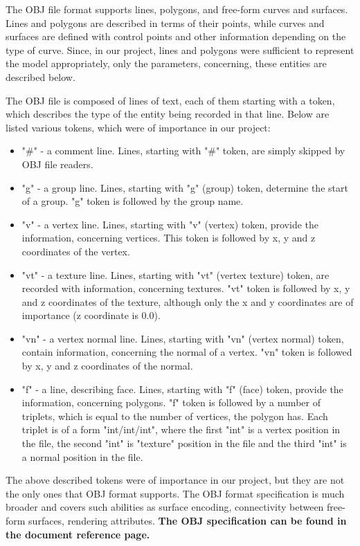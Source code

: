\documentclass[times, 10pt,twocolumn]{article}
\begin{document}
The OBJ file format supports lines, polygons, and free-form curves and surfaces. Lines and polygons are described in terms of their points, while curves and surfaces are defined with control points and other information depending on the type of curve. Since, in our project, lines and polygons were sufficient to represent the model appropriately, only the parameters, concerning, these entities are described below.

The OBJ file is composed of lines of text, each of them starting with a token, which describes the type of the entity being  recorded in that line. Below are listed various tokens, which were of importance in our project:

\begin{itemize}
\item "\#" - a comment line. Lines, starting with "\#" token, are simply skipped by OBJ file readers.
\item "g" - a group line. Lines, starting with "g" (group) token, determine the start of a group. "g" token is followed by the group name.
\item "v" - a vertex line. Lines, starting with "v" (vertex) token, provide the information, concerning vertices. This token is followed by x, y and z coordinates of the vertex.
\item "vt" - a texture line. Lines, starting with "vt" (vertex texture) token, are recorded with information, concerning textures. "vt" token is followed by x, y and z coordinates of the texture, although only the x and y coordinates are of importance (z coordinate is 0.0).
\item "vn" - a vertex normal line. Lines, starting with "vn" (vertex normal) token, contain information, concerning the normal of a vertex. "vn" token is followed by x, y and z coordinates of the normal.
\item "f" - a line, describing face. Lines, starting with "f" (face) token, provide the information, concerning polygons. "f" token is followed by a number of triplets, which is equal to the number of vertices, the polygon has. Each triplet is of a form "int/int/int", where the first "int" is a vertex position in the file, the second "int" is "texture" position in the file and the third "int" is a normal position in the file.
\end{itemize}

The above described tokens were of importance in our project, but they are not the only ones that OBJ format supports. The OBJ format specification is much broader and covers such abilities as surface encoding, connectivity between free-form surfaces, rendering attributes. \textbf{The OBJ specification can be found in the document reference page.}
\end{document}
